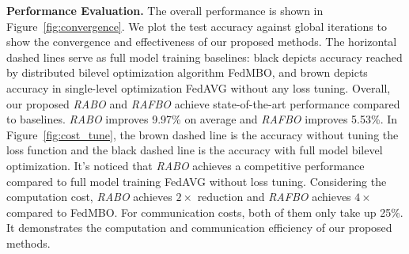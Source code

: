 \documentclass[lettersize,journal]{IEEEtran}
\begin{document}
\textbf{Performance Evaluation.} The overall performance is shown in Figure~\ref{fig:convergence}. We plot the test accuracy against global iterations to show the convergence and effectiveness of our proposed methods. The horizontal dashed lines serve as full model training baselines: black depicts accuracy reached
by distributed bilevel optimization algorithm FedMBO, and brown depicts accuracy in single-level optimization FedAVG without any loss tuning. Overall, our proposed \textit{RABO} and \textit{RAFBO} achieve state-of-the-art performance compared to baselines. \textit{RABO} improves 9.97\% on average and \textit{RAFBO} improves 5.53\%. In Figure~\ref{fig:cost_tune}, the brown dashed line is the accuracy without tuning the loss function and the black
dashed line is the accuracy with full model bilevel optimization. It's noticed that \textit{RABO} achieves a competitive performance compared to full model training FedAVG without loss tuning. Considering the computation cost, \textit{RABO} achieves $2\times$ reduction and \textit{RAFBO} achieves $4\times$ compared to FedMBO. For communication costs, both of them only take up 25\%. It demonstrates the computation and communication efficiency of our proposed methods.

\end{document}
